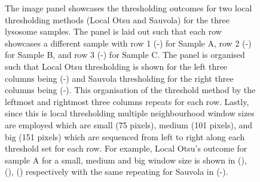 \begin{figure}[h!]
    \caption[Image panel showcasing the thresholding outcome of lysosome samples using local thresholding methods for different window sizes]{The image panel showcases the thresholding outcomes for two local thresholding methods (Local Otsu and Sauvola) for the three lysosome samples. The panel is laid out such that each row showcases a different sample with row 1 (-) for Sample A, row 2 (-) for Sample B, and row 3 (-) for Sample C. The panel is organised such that Local Otsu thresholding is shown for the left three columns being (-) and Sauvola thresholding for the right three columns being (-). This organisation of the threshold method by the leftmost and rightmost three columns repeats for each row. Lastly, since this is local thresholding multiple neighbourhood window sizes are employed which are small (75 pixels), medium (101 pixels), and big (151 pixels) which are sequenced from left to right along each threshold set for each row. For example, Local Otsu's outcome for sample A for a small, medium and big window size is shown in (), (), () respectively with the same repeating for Sauvola in (-).}
    \label{fig:local_figpanel}
\end{figure}

